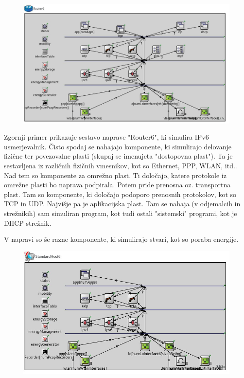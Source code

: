 \documentclass[11pt,a4paper,slovene]{myarticle}
\begin{document}
\begin{figure}[h]
  \includegraphics[width=\linewidth]{router6.jpg}
\end{figure}

Zgornji primer prikazuje sestavo naprave "Router6", ki simulira IPv6 usmerjevalnik.
Čisto spodaj se nahajajo komponente, ki simulirajo delovanje fizične ter povezovalne plasti (skupaj se imenujeta "dostopovna plast"). Ta je sestavljena iz različnih fizičnih vmesnikov, kot so Ethernet, PPP, WLAN, itd..
Nad tem so komponente za omrežno plast. Ti določajo, katere protokole iz omrežne plasti bo naprava podpirala.
Potem pride prenosna oz. transportna plast. Tam so komponente, ki določajo podoporo prenosnih protokolov, kot so TCP in UDP.
Najvišje pa je aplikacijska plast. Tam se nahaja (v odjemalcih in strežnikih) sam simuliran program, kot tudi ostali "sistemski" programi, kot je DHCP strežnik.

V napravi so še razne komponente, ki simulirajo stvari, kot so poraba energije.

\begin{figure}[h]
  \includegraphics[width=\linewidth]{standardhost6.jpg}
\end{figure}
\end{document}
